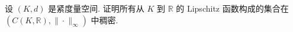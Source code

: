 

\begin{exercise}[10]
    设 $(K,d)$ 是紧度量空间. 证明所有从 $K$ 到 $\mathbb{R}$ 的 Lipschitz 函数构成的集合在 $(C(K,\mathbb{R}),\|\cdot\|_{\infty})$ 中稠密.
\end{exercise}

